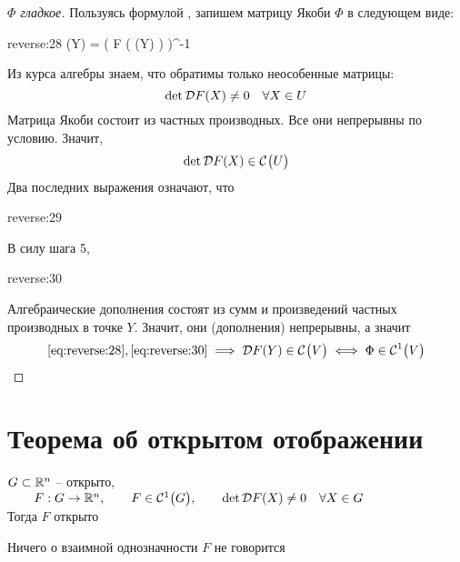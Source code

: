 \begin{proof}[$ \Phi $ гладкое]
	Пользуясь формулой , запишем матрицу Якоби $ \Phi $ в следующем виде:
	\begin{equ}{reverse:28}
		\Phi(Y) = \bigg( F \big( \Phi(Y) \big) \bigg)^{-1}
	\end{equ}
	Из курса алгебры знаем, что обратимы только неособенные матрицы:
	$$ \det \mc{D}F(X) \ne 0 \quad \forall X \in U $$
	Матрица Якоби состоит из частных производных. Все они непрерывны по условию. Значит,
	$$ \det \mc{D}F(X) \in \Cont{U} $$
	Два последних выражения означают, что
	\begin{equ}{reverse:29}
		 \in {}
	\end{equ}
	В силу шага 5,
	\begin{equ}{reverse:30}
		 \implies {} \in {}
	\end{equ}
	Алгебраические дополнения состоят из сумм и произведений частных производных в точке $ Y $. Значит, они (дополнения) непрерывны, а значит
	$$ \eref{reverse:28}, \eref{reverse:30} \implies \mc{D}F(Y) \in \Cont{V} \iff \Phi \in \Cont[1]{V} $$
\end{proof}

\section{Теорема об открытом отображении}

\begin{theorem}
	$ G \sub \R^n $ -- открыто, $ \qquad F : G \to \R^n, \qquad F \in \Cont[1]G, \qquad \det \mc{D}F(X) \ne 0 \quad \forall X \in G $ \\
	Тогда $ F $ открыто
\end{theorem}

\begin{remark}
	Ничего о взаимной однозначности $ F $ не говорится
\end{remark}


